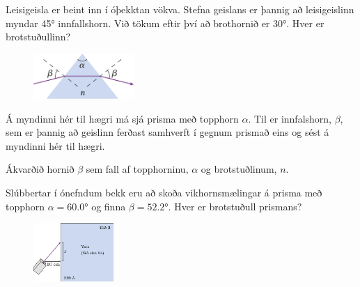 \ifdefined \wholebook \else\documentclass[oneside]{book}\usepackage{EdlBook}\graphicspath{{figures/}}
\begin{document}
\begin{enumerate}[label = \textbf{(\alph*)}]

\item[\textbf{(34.10)}] Leisigeisla er beint inn í óþekktan vökva. Stefna geislans er þannig að leisigeislinn myndar \ang{45} innfallshorn. Við tökum eftir því að brothornið er \ang{30}. Hver er brotstuðullinn?

\vspace{0.5cm}

\begin{minipage}{\linewidth}
\begin{figure}
\vspace{-0.5cm}
\includegraphics[width = 1.5in]{figures/vikhorn.pdf}
\end{figure}

\item[\textbf{(34.58)}] Á myndinni hér til hægri má sjá prisma með topphorn $\alpha$. Til er innfalshorn, $\beta$, sem er þannig að geislinn ferðast samhverft í gegnum prismað eins og sést á myndinni hér til hægri. \begin{enumerate*}[label = \textbf{(\alph*)}]
    \item Ákvarðið hornið $\beta$ sem fall af topphorninu, $\alpha$ og brotstuðlinum, $n$.
    \item Slúbbertar í ónefndum bekk eru að skoða vikhornsmælingar á prisma með topphorn $\alpha = \ang{60.0}$ og finna $\beta = \ang{52.2}$. Hver er brotstuðull prismans?
\end{enumerate*}

\vspace{0.5cm}

\begin{minipage}{\linewidth}
\begin{figure}
\vspace{-0.5cm}
\includegraphics[width = 1.2in]{figures/rk3354.pdf}
\end{figure}


\end{minipage}
\end{minipage}
\end{enumerate}
\end{document}
